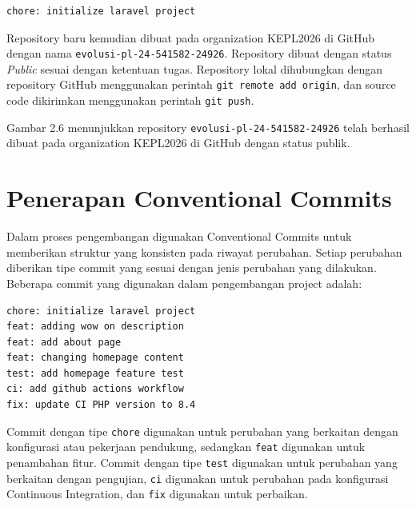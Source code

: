\begin{lstlisting}
chore: initialize laravel project
\end{lstlisting}

Repository baru kemudian dibuat pada organization KEPL2026 di GitHub dengan nama \texttt{evolusi-pl-24-541582-24926}. Repository dibuat dengan status \textit{Public} sesuai dengan ketentuan tugas. Repository lokal dihubungkan dengan repository GitHub menggunakan perintah \texttt{git remote add origin}, dan source code dikirimkan menggunakan perintah \texttt{git push}.


Gambar 2.6 menunjukkan repository \texttt{evolusi-pl-24-541582-24926} telah berhasil dibuat pada organization KEPL2026 di GitHub dengan status publik.

\section{Penerapan Conventional Commits}

Dalam proses pengembangan digunakan Conventional Commits untuk memberikan struktur yang konsisten pada riwayat perubahan. Setiap perubahan diberikan tipe commit yang sesuai dengan jenis perubahan yang dilakukan. Beberapa commit yang digunakan dalam pengembangan project adalah:

\begin{lstlisting}
chore: initialize laravel project
feat: adding wow on description
feat: add about page
feat: changing homepage content
test: add homepage feature test
ci: add github actions workflow
fix: update CI PHP version to 8.4
\end{lstlisting}

Commit dengan tipe \texttt{chore} digunakan untuk perubahan yang berkaitan dengan konfigurasi atau pekerjaan pendukung, sedangkan \texttt{feat} digunakan untuk penambahan fitur. Commit dengan tipe \texttt{test} digunakan untuk perubahan yang berkaitan dengan pengujian, \texttt{ci} digunakan untuk perubahan pada konfigurasi Continuous Integration, dan \texttt{fix} digunakan untuk perbaikan.


